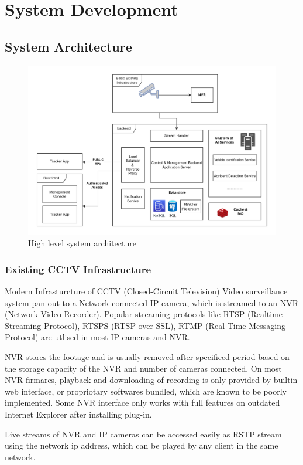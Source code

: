 \chapter{System Development}
\lipsum[1]


\section{System Architecture}

\begin{figure}
	\centering
	\includegraphics[width=0.8\linewidth]{Images/architecture_high_level}
	\caption{High level system architecture}
	\label{fig:architecturehighlevel}
\end{figure}


\subsection{Existing CCTV Infrastructure}
Modern Infrasturcture of CCTV (Closed-Circuit Television) Video surveillance system pan out to a Network connected IP camera, which is streamed to an NVR (Network Video Recorder). Popular streaming protocols like RTSP (Realtime Streaming Protocol), RTSPS (RTSP over SSL), RTMP (Real-Time Messaging Protocol) are utlised in most IP cameras and NVR. 

NVR stores the footage and is usually removed after specificed period based on the storage capacity of the NVR and number of cameras connected. On most NVR firmares, playback and downloading of recording is only provided by builtin web interface, or propriotary softwares bundled, which are known to be poorly implemented. Some NVR interface only works with full features on outdated Internet Explorer after installing plug-in.

Live streams of NVR and IP cameras can be accessed easily as RSTP stream using the network ip address, which can be played by any client in the same network.

